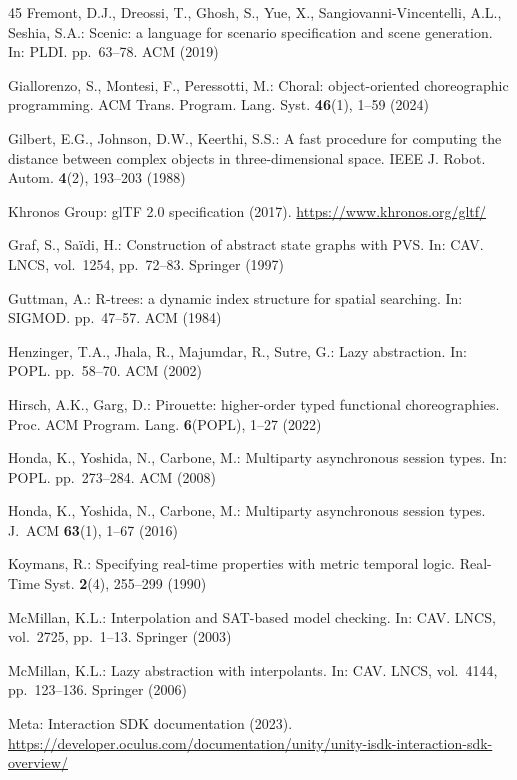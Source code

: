 \documentclass[11pt,a4paper]{article}
\begin{document}
\begin{thebibliography}{45}
Fremont, D.J., Dreossi, T., Ghosh, S., Yue, X., Sangiovanni-Vincentelli, A.L.,
Seshia, S.A.: Scenic: a language for scenario specification and scene generation.
In: PLDI. pp.~63--78. ACM (2019)


Giallorenzo, S., Montesi, F., Peressotti, M.:
Choral: object-oriented choreographic programming.
ACM Trans. Program. Lang. Syst. \textbf{46}(1), 1--59 (2024)

Gilbert, E.G., Johnson, D.W., Keerthi, S.S.:
A fast procedure for computing the distance between complex objects in
three-dimensional space. IEEE J. Robot. Autom. \textbf{4}(2), 193--203 (1988)

Khronos Group: glTF 2.0 specification (2017).
\url{https://www.khronos.org/gltf/}

Graf, S., Sa\"{i}di, H.: Construction of abstract state graphs with PVS.
In: CAV. LNCS, vol.~1254, pp.~72--83. Springer (1997)

Guttman, A.: R-trees: a dynamic index structure for spatial searching.
In: SIGMOD. pp.~47--57. ACM (1984)

Henzinger, T.A., Jhala, R., Majumdar, R., Sutre, G.:
Lazy abstraction. In: POPL. pp.~58--70. ACM (2002)

Hirsch, A.K., Garg, D.: Pirouette: higher-order typed functional choreographies.
Proc. ACM Program. Lang. \textbf{6}(POPL), 1--27 (2022)

Honda, K., Yoshida, N., Carbone, M.:
Multiparty asynchronous session types.
In: POPL. pp.~273--284. ACM (2008)

Honda, K., Yoshida, N., Carbone, M.:
Multiparty asynchronous session types.
J.~ACM \textbf{63}(1), 1--67 (2016)

Koymans, R.: Specifying real-time properties with metric temporal logic.
Real-Time Syst. \textbf{2}(4), 255--299 (1990)


McMillan, K.L.: Interpolation and SAT-based model checking.
In: CAV. LNCS, vol.~2725, pp.~1--13. Springer (2003)

McMillan, K.L.: Lazy abstraction with interpolants.
In: CAV. LNCS, vol.~4144, pp.~123--136. Springer (2006)

Meta: Interaction SDK documentation (2023).
\url{https://developer.oculus.com/documentation/unity/unity-isdk-interaction-sdk-overview/}


\end{thebibliography}
\end{document}

